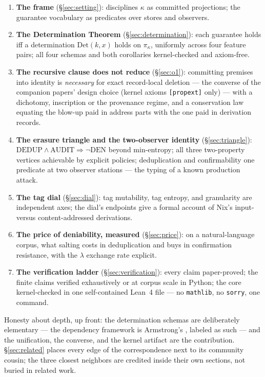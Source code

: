 \documentclass[10pt]{article}
\begin{document}
\begin{enumerate}
\item \textbf{The frame} (\S\ref{sec:setting}): disciplines $\kappa$ as committed projections; the guarantee vocabulary as predicates over stores and observers.
\item \textbf{The Determination Theorem} (\S\ref{sec:determination}): each guarantee holds iff a determination $\mathrm{Det}(k,x)$ holds on $\pi_\kappa$, uniformly across four feature pairs; all four schemas and both corollaries kernel-checked and axiom-free.
\item \textbf{The recursive clause does not reduce} (\S\ref{sec:o1}): committing premises into identity is \emph{necessary} for exact record-local deletion --- the converse of the companion papers' design choice (kernel axioms \texttt{[propext]} only) --- with a dichotomy, inscription or the provenance regime, and a conservation law equating the blow-up paid in address parts with the one paid in derivation records.
\item \textbf{The erasure triangle and the two-observer identity} (\S\ref{sec:triangle}): $\mathrm{DEDUP}\wedge\mathrm{AUDIT}\Rightarrow\neg\mathrm{DEN}$ beyond min-entropy; all three two-property vertices achievable by explicit policies; deduplication and confirmability one predicate at two observer stations --- the typing of a known production attack.
\item \textbf{The tag dial} (\S\ref{sec:dial}): tag mutability, tag entropy, and granularity are independent axes; the dial's endpoints give a formal account of Nix's input- versus content-addressed derivations.
\item \textbf{The price of deniability, measured} (\S\ref{sec:price}): on a natural-language corpus, what salting costs in deduplication and buys in confirmation resistance, with the $\lambda$ exchange rate explicit.
\item \textbf{The verification ladder} (\S\ref{sec:verification}): every claim paper-proved; the finite claims verified exhaustively or at corpus scale in Python; the core kernel-checked in one self-contained Lean~4 file --- no \texttt{mathlib}, no \texttt{sorry}, one command.
\end{enumerate}

Honesty about depth, up front: the determination schemas are deliberately elementary --- the dependency framework is Armstrong's \cite{Armstrong74}, labeled as such --- and the unification, the converse, and the kernel artifact are the contribution. \S\ref{sec:related} places every edge of the correspondence next to its community cousin; the three closest neighbors are credited inside their own sections, not buried in related work.
\end{document}
